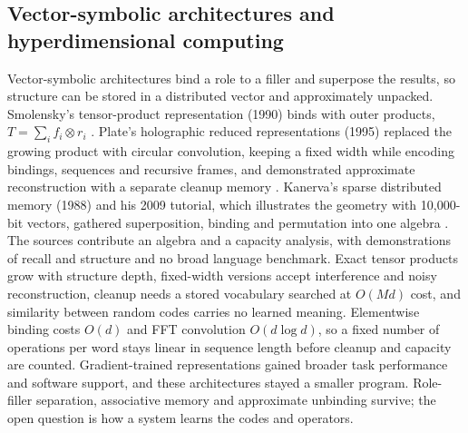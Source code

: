 \subsection{Vector-symbolic architectures and hyperdimensional computing}
Vector-symbolic architectures bind a role to a filler and superpose the results, so structure can be stored in a distributed vector and approximately unpacked. Smolensky's tensor-product representation (1990) binds with outer products, $T=\sum_i f_i\otimes r_i$ \cite{pre27}. Plate's holographic reduced representations (1995) replaced the growing product with circular convolution, keeping a fixed width while encoding bindings, sequences and recursive frames, and demonstrated approximate reconstruction with a separate cleanup memory \cite{pre28}. Kanerva's sparse distributed memory (1988) and his 2009 tutorial, which illustrates the geometry with 10,000-bit vectors, gathered superposition, binding and permutation into one algebra \cite{pre30,pre29}. The sources contribute an algebra and a capacity analysis, with demonstrations of recall and structure and no broad language benchmark. Exact tensor products grow with structure depth, fixed-width versions accept interference and noisy reconstruction, cleanup needs a stored vocabulary searched at $O(Md)$ cost, and similarity between random codes carries no learned meaning. Elementwise binding costs $O(d)$ and FFT convolution $O(d\log d)$, so a fixed number of operations per word stays linear in sequence length before cleanup and capacity are counted. Gradient-trained representations gained broader task performance and software support, and these architectures stayed a smaller program. Role-filler separation, associative memory and approximate unbinding survive; the open question is how a system learns the codes and operators.

